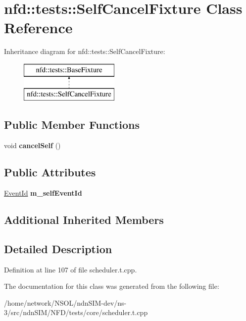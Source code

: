 \hypertarget{classnfd_1_1tests_1_1SelfCancelFixture}{}\section{nfd\+:\+:tests\+:\+:Self\+Cancel\+Fixture Class Reference}
\label{classnfd_1_1tests_1_1SelfCancelFixture}
Inheritance diagram for nfd\+:\+:tests\+:\+:Self\+Cancel\+Fixture\+:\begin{figure}[H]
\begin{center}
\leavevmode
\includegraphics[height=2.000000cm]{classnfd_1_1tests_1_1SelfCancelFixture}
\end{center}
\end{figure}
\subsection*{Public Member Functions}
\begin{DoxyCompactItemize}
\item 
void {\bfseries cancel\+Self} ()\hypertarget{classnfd_1_1tests_1_1SelfCancelFixture_a5cc08909bbab02624f61207a6ceab0c8}{}\label{classnfd_1_1tests_1_1SelfCancelFixture_a5cc08909bbab02624f61207a6ceab0c8}

\end{DoxyCompactItemize}
\subsection*{Public Attributes}
\begin{DoxyCompactItemize}
\item 
\hyperlink{classEventId}{Event\+Id} {\bfseries m\+\_\+self\+Event\+Id}\hypertarget{classnfd_1_1tests_1_1SelfCancelFixture_a3f300efba845841f20387677fb69e01c}{}\label{classnfd_1_1tests_1_1SelfCancelFixture_a3f300efba845841f20387677fb69e01c}

\end{DoxyCompactItemize}
\subsection*{Additional Inherited Members}


\subsection{Detailed Description}


Definition at line 107 of file scheduler.\+t.\+cpp.



The documentation for this class was generated from the following file\+:\begin{DoxyCompactItemize}
\item 
/home/network/\+N\+S\+O\+L/ndn\+S\+I\+M-\/dev/ns-\/3/src/ndn\+S\+I\+M/\+N\+F\+D/tests/core/scheduler.\+t.\+cpp\end{DoxyCompactItemize}

